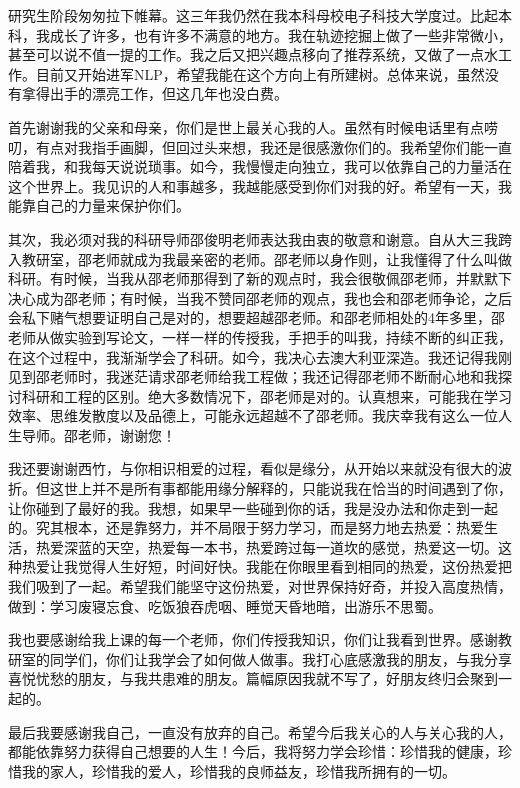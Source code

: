 

\indent
研究生阶段匆匆拉下帷幕。这三年我仍然在我本科母校电子科技大学度过。比起本科，我成长了许多，也有许多不满意的地方。我在轨迹挖掘上做了一些非常微小，甚至可以说不值一提的工作。我之后又把兴趣点移向了推荐系统，又做了一点水工作。目前又开始进军NLP，希望我能在这个方向上有所建树。总体来说，虽然没有拿得出手的漂亮工作，但这几年也没白费。

首先谢谢我的父亲和母亲，你们是世上最关心我的人。虽然有时候电话里有点唠叨，有点对我指手画脚，但回过头来想，我还是很感激你们的。我希望你们能一直陪着我，和我每天说说琐事。如今，我慢慢走向独立，我可以依靠自己的力量活在这个世界上。我见识的人和事越多，我越能感受到你们对我的好。希望有一天，我能靠自己的力量来保护你们。

其次，我必须对我的科研导师邵俊明老师表达我由衷的敬意和谢意。自从大三我跨入教研室，邵老师就成为我最亲密的老师。邵老师以身作则，让我懂得了什么叫做科研。有时候，当我从邵老师那得到了新的观点时，我会很敬佩邵老师，并默默下决心成为邵老师；有时候，当我不赞同邵老师的观点，我也会和邵老师争论，之后会私下赌气想要证明自己是对的，想要超越邵老师。和邵老师相处的4年多里，邵老师从做实验到写论文，一样一样的传授我，手把手的叫我，持续不断的纠正我，在这个过程中，我渐渐学会了科研。如今，我决心去澳大利亚深造。我还记得我刚见到邵老师时，我迷茫请求邵老师给我工程做；我还记得邵老师不断耐心地和我探讨科研和工程的区别。绝大多数情况下，邵老师是对的。认真想来，可能我在学习效率、思维发散度以及品德上，可能永远超越不了邵老师。我庆幸我有这么一位人生导师。邵老师，谢谢您！

我还要谢谢西竹，与你相识相爱的过程，看似是缘分，从开始以来就没有很大的波折。但这世上并不是所有事都能用缘分解释的，只能说我在恰当的时间遇到了你，让你碰到了最好的我。我想，如果早一些碰到你的话，我是没办法和你走到一起的。究其根本，还是靠努力，并不局限于努力学习，而是努力地去热爱：热爱生活，热爱深蓝的天空，热爱每一本书，热爱跨过每一道坎的感觉，热爱这一切。这种热爱让我觉得人生好短，时间好快。我能在你眼里看到相同的热爱，这份热爱把我们吸到了一起。希望我们能坚守这份热爱，对世界保持好奇，并投入高度热情，做到：学习废寝忘食、吃饭狼吞虎咽、睡觉天昏地暗，出游乐不思蜀。

我也要感谢给我上课的每一个老师，你们传授我知识，你们让我看到世界。感谢教研室的同学们，你们让我学会了如何做人做事。我打心底感激我的朋友，与我分享喜悦忧愁的朋友，与我共患难的朋友。篇幅原因我就不写了，好朋友终归会聚到一起的。

最后我要感谢我自己，一直没有放弃的自己。希望今后我关心的人与关心我的人，都能依靠努力获得自己想要的人生！今后，我将努力学会珍惜：珍惜我的健康，珍惜我的家人，珍惜我的爱人，珍惜我的良师益友，珍惜我所拥有的一切。


